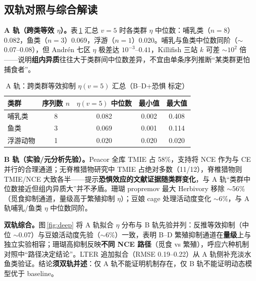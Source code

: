\documentclass[12pt,a4paper]{ctexart}
\begin{document}
\subsection{双轨对照与综合解读}

\textbf{A 轨（跨类等效 $\eta$）。}表\,\ref{tab:eta-group} 汇总 $v=5$ 时各类群 $\eta$ 中位数：哺乳类（$n=8$）0.082，鱼类（$n=3$）0.069，浮游（$n=1$）0.020。哺乳与鱼类中位数同阶（$\sim$0.07--0.08），但 Andrén 七区 $\eta$ 极差达 $10^{-3}$--$0.41$，Killifish 三站 $k$ 可差 $\sim 10^2$ 倍——说明\textbf{组内异质}往往大于类群间中位数差异，不宜由单条序列推断“某类群更怕捕食者”。

\begin{table}[H]
  \centering
  \caption{A 轨：跨类群等效抑制 $\eta(v=5)$ 汇总（B--D+恐惧 标定）}
  \label{tab:eta-group}
  \small
  \begin{tabular}{lcccc}
    \toprule
    类群 & 序列数 $n$ & $\eta(v=5)$ 中位数 & 最小值 & 最大值 \\
    \midrule
    哺乳类 & 8 & 0.082 & 0.002 & 0.408 \\
    鱼类 & 3 & 0.069 & 0.001 & 0.114 \\
    浮游动物 & 1 & 0.020 & 0.020 & 0.020 \\
    \bottomrule
  \end{tabular}
\end{table}

\textbf{B 轨（实验/元分析先验）。}Peacor 全库 TMIE 占 58\%，支持将 NCE 作为与 CE 并行的合理通道；无脊椎猎物研究中 TMIE 占绝对多数（11/12），脊椎猎物则 TMIE/NCE 大致各半——提示\textbf{恐惧效应的文献证据随类群变化}，与 A 轨“类群中位数接近但组内异质大”并不矛盾。珊瑚 propremov 最大 Herbivory 移除 $\sim$56\%（觅食抑制通道，量级高于繁殖抑制 $\eta$）；豆娘 cage 处理活动度变化 $\sim$6\%，与 A 轨哺乳/鱼类 $\eta$ 中位数同阶。

\textbf{双轨综合。}图\,\ref{fig:deep} 将 A 轨拟合 $\eta$ 分布与 B 轨先验并列：反推等效抑制（中位 $\sim$0.07）与豆娘活动度先验（$\sim$6\%）一致，表明 B--D 繁殖抑制通道在\textbf{量级}上与独立实验相容；珊瑚高抑制反映\textbf{不同 NCE 路径}（觅食 vs 繁殖），呼应六种机制对照中“路径决定结论”。LTER 追加拟合（RMSE 0.19--0.22）从 A 轨侧补充淡水鱼类验证。结论\textbf{须双轨并述}：仅 A 轨不能证明机制存在，仅 B 轨不能证明动态模型优于 baseline。
\end{document}
